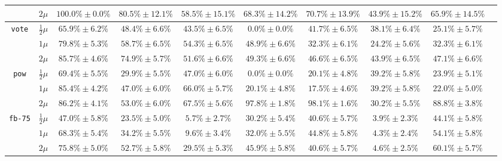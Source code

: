 \begin{table}[htpb]
{\begin{tabular}{cccccccccc}
        & $2\mu$ & $\mathbf{100.0\% \pm 0.0\%}$ & $80.5\% \pm 12.1\%$ & $58.5\% \pm 15.1\%$ & $68.3\% \pm 14.2\%$ & $70.7\% \pm 13.9\%$ & $43.9\% \pm 15.2\%$ & $65.9\% \pm 14.5\%$ \\
        \midrule
        \multirow{3}{*}{\texttt{vote}} 
        & $\frac{1}{2}\mu$ & $\mathbf{65.9\% \pm 6.2\%}$ & $48.4\% \pm 6.6\%$ & $43.5\% \pm 6.5\%$ & $0.0\% \pm 0.0\%$ & $41.7\% \pm 6.5\%$ & $38.1\% \pm 6.4\%$ & $25.1\% \pm 5.7\%$ \\
        & $1\mu$ & $\mathbf{79.8\% \pm 5.3\%}$ & $58.7\% \pm 6.5\%$ & $54.3\% \pm 6.5\%$ & $48.9\% \pm 6.6\%$ & $32.3\% \pm 6.1\%$ & $24.2\% \pm 5.6\%$ & $32.3\% \pm 6.1\%$ \\
        & $2\mu$ & $\mathbf{85.7\% \pm 4.6\%}$ & $74.9\% \pm 5.7\%$ & $51.6\% \pm 6.6\%$ & $49.3\% \pm 6.6\%$ & $46.6\% \pm 6.5\%$ & $43.9\% \pm 6.5\%$ & $47.1\% \pm 6.6\%$ \\
        \midrule
        \multirow{3}{*}{\texttt{pow}} 
        & $\frac{1}{2}\mu$ & $\mathbf{69.4\% \pm 5.5\%}$ & $29.9\% \pm 5.5\%$ & $47.0\% \pm 6.0\%$ & $0.0\% \pm 0.0\%$ & $20.1\% \pm 4.8\%$ & $39.2\% \pm 5.8\%$ & $23.9\% \pm 5.1\%$ \\
        & $1\mu$ & $\mathbf{85.4\% \pm 4.2\%}$ & $47.0\% \pm 6.0\%$ & $66.0\% \pm 5.7\%$ & $20.1\% \pm 4.8\%$ & $17.5\% \pm 4.6\%$ & $39.2\% \pm 5.8\%$ & $22.0\% \pm 5.0\%$ \\
        & $2\mu$ & $86.2\% \pm 4.1\%$ & $53.0\% \pm 6.0\%$ & $67.5\% \pm 5.6\%$ & $97.8\% \pm 1.8\%$ & $\mathbf{98.1\% \pm 1.6\%}$ & $30.2\% \pm 5.5\%$ & $88.8\% \pm 3.8\%$ \\
        \midrule
        \multirow{3}{*}{\texttt{fb-75}} 
        & $\frac{1}{2}\mu$ & $\mathbf{47.0\% \pm 5.8\%}$ & $23.5\% \pm 5.0\%$ & $5.7\% \pm 2.7\%$ & $30.2\% \pm 5.4\%$ & $40.6\% \pm 5.7\%$ & $3.9\% \pm 2.3\%$ & $44.1\% \pm 5.8\%$ \\
        & $1\mu$ & $\mathbf{68.3\% \pm 5.4\%}$ & $34.2\% \pm 5.5\%$ & $9.6\% \pm 3.4\%$ & $32.0\% \pm 5.5\%$ & $44.8\% \pm 5.8\%$ & $4.3\% \pm 2.4\%$ & $54.1\% \pm 5.8\%$ \\
        & $2\mu$ & $\mathbf{75.8\% \pm 5.0\%}$ & $52.7\% \pm 5.8\%$ & $29.5\% \pm 5.3\%$ & $45.9\% \pm 5.8\%$ & $40.6\% \pm 5.7\%$ & $4.6\% \pm 2.5\%$ & $60.1\% \pm 5.7\%$ \\
        \bottomrule
    \end{tabular}
    }
\end{table}

